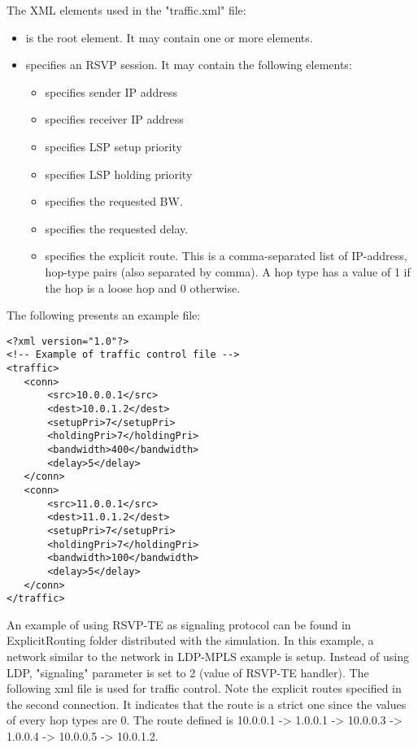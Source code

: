 The XML elements used in the "traffic.xml" file:

\begin{itemize}
  \item {} is the root element. It may contain one or more  elements.
  \item {} specifies an RSVP session. It may contain the following elements:
  \begin{itemize}
    \item {} specifies sender IP address
    \item {} specifies receiver IP address
    \item {} specifies LSP setup priority
    \item {} specifies LSP holding priority
    \item {} specifies the requested BW.
    \item {} specifies the requested delay.
    \item {} specifies the explicit route. This is a comma-separated
      list of IP-address, hop-type pairs (also separated by comma).
      A hop type has a value of 1 if the hop is a loose hop and 0 otherwise.
  \end{itemize}
\end{itemize}

The following presents an example file:

\begin{verbatim}
<?xml version="1.0"?>
<!-- Example of traffic control file -->
<traffic>
   <conn>
       <src>10.0.0.1</src>
       <dest>10.0.1.2</dest>
       <setupPri>7</setupPri>
       <holdingPri>7</holdingPri>
       <bandwidth>400</bandwidth>
       <delay>5</delay>
   </conn>
   <conn>
       <src>11.0.0.1</src>
       <dest>11.0.1.2</dest>
       <setupPri>7</setupPri>
       <holdingPri>7</holdingPri>
       <bandwidth>100</bandwidth>
       <delay>5</delay>
   </conn>
</traffic>
\end{verbatim}

An example of using RSVP-TE as signaling protocol can be found in
ExplicitRouting folder distributed with the simulation. In this
example, a network similar to the network in LDP-MPLS example is
setup. Instead of using LDP, "signaling" parameter is set to 2 (value
of RSVP-TE handler). The following xml file is used for traffic
control. Note the explicit routes specified in the second connection.
It indicates that the route is a strict one since the values of every
hop types are 0. The route defined is 10.0.0.1 -> 1.0.0.1 ->
10.0.0.3 -> 1.0.0.4 -> 10.0.0.5 -> 10.0.1.2.

